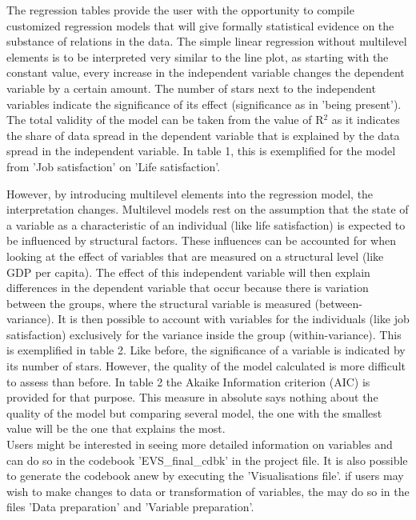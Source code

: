 \documentclass[preprint,12pt,authoryear]{elsarticle}
\begin{document}


The regression tables provide the user with the opportunity to compile customized regression models that will give formally statistical evidence on the substance of relations in the data. The simple linear regression without multilevel elements is to be interpreted very similar to the line plot, as starting with the constant value, every increase in the independent variable changes the dependent variable by a certain amount. The number of stars next to the independent variables indicate the significance of its effect (significance as in 'being present'). The total validity of the model can be taken from the value of R$^2$ as it indicates the share of data spread in the dependent variable that is explained by the data spread in the independent variable. In table 1, this is exemplified for the model from 'Job satisfaction' on 'Life satisfaction'. 



However, by introducing multilevel elements into the regression model, the interpretation changes. Multilevel models rest on the assumption that the state of a variable as a characteristic of an individual (like life satisfaction) is expected to be influenced by structural factors. These influences can be accounted for when looking at the effect of variables that are measured on a structural level (like GDP per capita). The effect of this independent variable will then explain differences in the dependent variable that occur because there is variation between the groups, where the structural variable is measured (between-variance). It is then possible to account with variables for the individuals (like job satisfaction) exclusively for the variance inside the group (within-variance). This is exemplified in table 2. Like before, the significance of a variable is indicated by its number of stars. However, the quality of the model calculated is more difficult to assess than before. In table 2 the Akaike Information criterion (AIC) is provided for that purpose. This measure in absolute says nothing about the quality of the model but comparing several model, the one with the smallest value will be the one that explains the most.\\ 

Users might be interested in seeing more detailed information on variables and can do so in the codebook 'EVS\_final\_cdbk' in the project file. It is also possible to generate the codebook anew by executing the 'Visualisations file'. if users may wish to make changes to data or transformation of variables, the may do so in the files 'Data preparation' and 'Variable preparation'.
\end{document}
